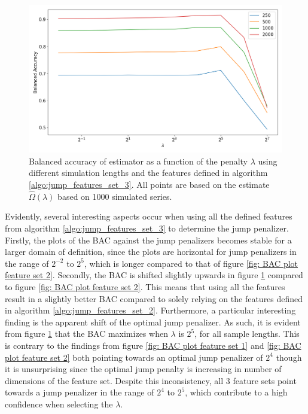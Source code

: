 \begin{figure}[H] 
    \centering
    \includegraphics[width=1\textwidth]{analysis/model_convergence/images/jump_penalties_feature_set_3_all.png}
    \caption [Balanced accuracy of \jump estimator using feature set 3]{Balanced accuracy of \jump estimator as a function of the penalty $\lambda$ using different simulation lengths and the features defined in algorithm \ref{algo:jump_features_set_3}. All points are based on the estimate $\hat{\Omega} (\lambda)$ based on 1000 simulated series.}
    \label{fig: BAC plot feature set 3}
\end{figure}

Evidently, several interesting aspects occur when using all the defined features from algorithm \ref{algo:jump_features_set_3} to determine the jump penalizer. Firstly, the plots of the BAC against the jump penalizers becomes stable for a larger domain of definition, since the plots are horizontal for jump penalizers in the range of $2^{-2}$ to $2^5$, which is longer compared to that of figure \ref{fig: BAC plot feature set 2}. Secondly, the BAC is shifted slightly upwards in figure \ref{fig: BAC plot feature set 3} compared to figure \ref{fig: BAC plot feature set 2}. This means that using all the features result in a slightly better BAC compared to solely relying on the features defined in algorithm \ref{algo:jump_features_set_2}. Furthermore, a particular interesting finding is the apparent shift of the optimal jump penalizer. As such, it is evident from figure \ref{fig: BAC plot feature set 3} that the BAC maximizes when $\lambda$ is $2^5$, for all sample lengths. This is contrary to the findings from figure \ref{fig: BAC plot feature set 1} and \ref{fig: BAC plot feature set 2} both pointing towards an optimal jump penalizer of $2^4$ though it is unsurprising since the optimal jump penalty is increasing in number of dimensions of the feature set. Despite this inconsistency, all 3 feature sets point towards a jump penalizer in the range of $2^4$ to $2^5$, which contribute to a high confidence when selecting the $\lambda$.

